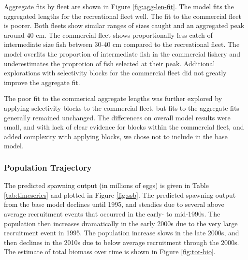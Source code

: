 \documentclass[11pt,
  english,
  a4paper,
]{article}
\begin{document}
Aggregate fits by fleet are shown in Figure \ref{fig:agg-len-fit}. The model fits the aggregated lengths for the recreational fleet well. The fit to the commercial fleet is poorer. Both fleets show similar ranges of sizes caught and an aggregated peak around 40 cm. The commercial fleet shows proportionally less catch of intermediate size fish between 30-40 cm compared to the recreational fleet. The model overfits the proportion of intermediate fish in the commercial fishery and underestimates the proprotion of fish selected at their peak. Additional explorations with selectivity blocks for the commercial fleet did not greatly improve the aggregate fit.

\leavevmode\tagmcend\tagstructend\par


The poor fit to the commerical aggregate lengths was further explored by applying selectivity blocks to the commercial fleet, but fits to the aggregate fits generally remained unchanged. The differences on overall model results were small, and with lack of clear evidence for blocks within the commercial fleet, and added complexity with applying blocks, we chose not to include in the base model.

\leavevmode\tagmcend\tagstructend\par


\hypertarget{population-trajectory}{%
\subsubsection{Population Trajectory}\label{population-trajectory}}

\leavevmode\tagmcend\tagstructend


The predicted spawning output (in millions of eggs) is given in Table \ref{tab:timeseries} and plotted in Figure \ref{fig:ssb}. The predicted spawning output from the base model declines until 1995, and steadies due to several above average recruitment events that occurred in the early- to mid-1990s. The population then increases dramatically in the early 2000s due to the very large recruitment event in 1995. The population increase slows in the late 2000s, and then declines in the 2010s due to below average recruitment through the 2000s. The estimate of total biomass over time is shown in Figure \ref{fig:tot-bio}.
\end{document}
